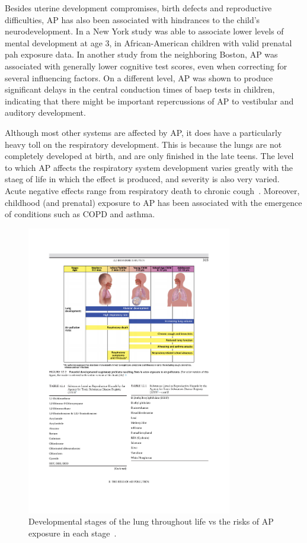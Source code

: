 Besides uterine development compromises, birth defects and reproductive
difficulties, \acrlong{AP} has also been associated with hindrances to
the child's neurodevelopment. In a New York study was able to associate
lower levels of mental development at age 3, in African-American
children with valid prenatal \gls{pah} exposure data. In another study
from the neighboring Boston, \gls{AP} was associated with generally lower
cognitive test scores, even when correcting for several influencing
factors. On a different level, \gls{AP} was shown to produce significant
delays in the central conduction times of \gls{baep} tests in children,
indicating that there might be important repercussions of \gls{AP} to
vestibular and auditory development.

Although most other systems are affected by \gls{AP}, it does have a
particularly heavy toll on the respiratory development. This is because
the lungs are not completely developed at birth, and are only finished
in the late teens. The level to which \gls{AP} affects the respiratory
system development varies greatly with the staeg of life in which the
effect is produced, and severity is also very varied. Acute negative
effects range from respiratory death to chronic
cough~\cite{Vallero2014}. Moreover, childhood (and prenatal) exposure to
\gls{AP} has been associated with the emergence of conditions such as
\gls{COPD} and asthma.

\begin{figure}[htpb]
    \centering
    \includegraphics[clip,%
        trim=3.4cm 15cm 3.4cm 3.6cm,%
        width=0.8\textwidth]{img/pdf/lung_development.pdf}
    \caption{Developmental stages of the lung throughout life vs the
    risks of \gls{AP} exposure in each stage~\cite{Vallero2014}.}
    \label{fig:img/lung_development}
\end{figure}


